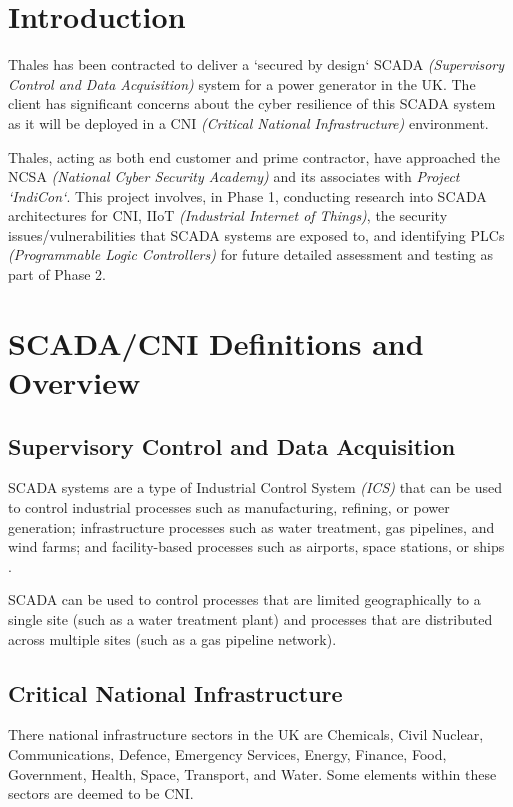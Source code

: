 \section{Introduction}
Thales has been contracted to deliver a `secured by design` SCADA \textit{(Supervisory Control and Data Acquisition)} system for a power generator in the UK. The client has significant concerns about the cyber resilience of this SCADA system as it will be deployed in a CNI \textit{(Critical National Infrastructure)} environment.

Thales, acting as both end customer and prime contractor, have approached the NCSA \textit{(National Cyber Security Academy)} and its associates with \textit{Project `IndiCon`}. This project involves, in Phase 1, conducting research into SCADA architectures for CNI, IIoT \textit{(Industrial Internet of Things)}, the security issues/vulnerabilities that SCADA systems are exposed to, and identifying PLCs \textit{(Programmable Logic Controllers)} for future detailed assessment and testing as part of Phase 2.


\section{SCADA/CNI Definitions and Overview}
\subsection{Supervisory Control and Data Acquisition}
SCADA systems are a type of Industrial Control System \textit{(ICS)} that can be used to control industrial processes such as manufacturing, refining, or power generation; infrastructure processes such as water treatment, gas pipelines, and wind farms; and facility-based processes such as airports, space stations, or ships \citep{site:scadasystems}.

SCADA can be used to control processes that are limited geographically to a single site (such as a water treatment plant) and processes that are distributed across multiple sites (such as a gas pipeline network).

\subsection{Critical National Infrastructure}
There national infrastructure sectors in the UK are Chemicals, Civil Nuclear, Communications, Defence, Emergency Services, Energy, Finance, Food, Government, Health, Space, Transport, and Water. Some elements within these sectors are deemed to be CNI.

